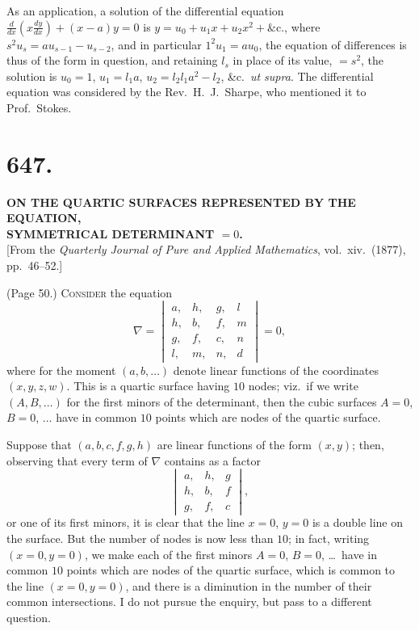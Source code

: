 \documentclass[11pt,a4paper]{article}
\begin{document}
As an application, a solution of the differential equation $\frac{d}{dx} \left(x \frac{dy}{dx}\right) + (x - a) y = 0$ is $y = u_0 + u_1 x + u_2 x^2 + \&\text{c.}$, where $s^2 u_s = a u_{s-1} - u_{s-2}$, and in particular $1^2 u_1 = a u_0$, the equation of differences is thus of the form in question, and retaining $l_s$ in place of its value, $= s^2$, the solution is $u_0 = 1$, $u_1 = l_1 a$, $u_2 = l_2 l_1 a^2 - l_2$, \&c.\ \textit{ut supra}. The differential equation was considered by the Rev.\ H.\ J.\ Sharpe, who mentioned it to Prof.\ Stokes.

\bigskip


\section*{647.}

\begin{center}
\textbf{ON THE QUARTIC SURFACES REPRESENTED BY THE EQUATION,\\SYMMETRICAL DETERMINANT $= 0$.}\\[1em]
[From the \textit{Quarterly Journal of Pure and Applied Mathematics}, vol.~xiv.\ (1877), pp.\ 46--52.]
\end{center}

\medskip

\noindent (Page 50.) \textsc{Consider} the equation
\[
\nabla = \begin{vmatrix} a, & h, & g, & l \\ h, & b, & f, & m \\ g, & f, & c, & n \\ l, & m, & n, & d \end{vmatrix} = 0,
\]
where for the moment $(a, b, \ldots)$ denote linear functions of the coordinates $(x, y, z, w)$. This is a quartic surface having $10$ nodes; viz.\ if we write $(A, B, \ldots)$ for the first minors of the determinant, then the cubic surfaces $A = 0$, $B = 0$, $\ldots$ have in common $10$ points which are nodes of the quartic surface.

Suppose that $(a, b, c, f, g, h)$ are linear functions of the form $(x, y)$; then, observing that every term of $\nabla$ contains as a factor
\[
\begin{vmatrix} a, & h, & g \\ h, & b, & f \\ g, & f, & c \end{vmatrix},
\]
or one of its first minors, it is clear that the line $x = 0$, $y = 0$ is a double line on the surface. But the number of nodes is now less than $10$; in fact, writing $(x = 0, y = 0)$, we make each of the first minors $A = 0$, $B = 0$, \ldots\ have in common $10$ points which are nodes of the quartic surface, which is common to the line $(x = 0, y = 0)$, and there is a diminution in the number of their common intersections. I do not pursue the enquiry, but pass to a different question.

\bigskip
\end{document}
